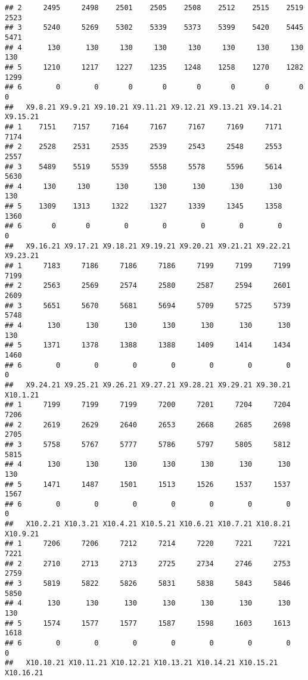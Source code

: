 \documentclass[
]{article}
\begin{document}
\begin{verbatim}
## 2     2495     2498    2501    2505    2508    2512    2515    2519    2523
## 3     5240     5269    5302    5339    5373    5399    5420    5445    5471
## 4      130      130     130     130     130     130     130     130     130
## 5     1210     1217    1227    1235    1248    1258    1270    1282    1299
## 6        0        0       0       0       0       0       0       0       0
##   X9.8.21 X9.9.21 X9.10.21 X9.11.21 X9.12.21 X9.13.21 X9.14.21 X9.15.21
## 1    7151    7157     7164     7167     7167     7169     7171     7174
## 2    2528    2531     2535     2539     2543     2548     2553     2557
## 3    5489    5519     5539     5558     5578     5596     5614     5630
## 4     130     130      130      130      130      130      130      130
## 5    1309    1313     1322     1327     1339     1345     1358     1360
## 6       0       0        0        0        0        0        0        0
##   X9.16.21 X9.17.21 X9.18.21 X9.19.21 X9.20.21 X9.21.21 X9.22.21 X9.23.21
## 1     7183     7186     7186     7186     7199     7199     7199     7199
## 2     2563     2569     2574     2580     2587     2594     2601     2609
## 3     5651     5670     5681     5694     5709     5725     5739     5748
## 4      130      130      130      130      130      130      130      130
## 5     1371     1378     1388     1388     1409     1414     1434     1460
## 6        0        0        0        0        0        0        0        0
##   X9.24.21 X9.25.21 X9.26.21 X9.27.21 X9.28.21 X9.29.21 X9.30.21 X10.1.21
## 1     7199     7199     7199     7200     7201     7204     7204     7206
## 2     2619     2629     2640     2653     2668     2685     2698     2705
## 3     5758     5767     5777     5786     5797     5805     5812     5815
## 4      130      130      130      130      130      130      130      130
## 5     1471     1487     1501     1513     1526     1537     1537     1567
## 6        0        0        0        0        0        0        0        0
##   X10.2.21 X10.3.21 X10.4.21 X10.5.21 X10.6.21 X10.7.21 X10.8.21 X10.9.21
## 1     7206     7206     7212     7214     7220     7221     7221     7221
## 2     2710     2713     2713     2725     2734     2746     2753     2759
## 3     5819     5822     5826     5831     5838     5843     5846     5850
## 4      130      130      130      130      130      130      130      130
## 5     1574     1577     1577     1587     1598     1603     1613     1618
## 6        0        0        0        0        0        0        0        0
##   X10.10.21 X10.11.21 X10.12.21 X10.13.21 X10.14.21 X10.15.21 X10.16.21

\end{verbatim}
\end{document}
